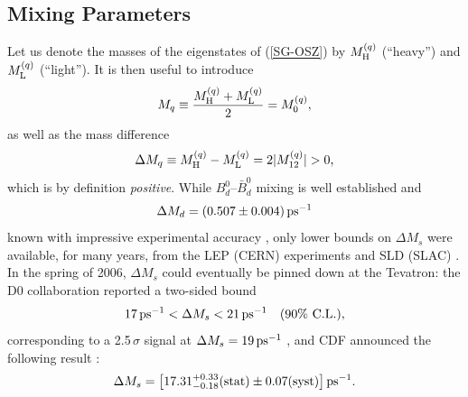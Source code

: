 \documentclass[11pt]{cernrep}
\begin{document}
\subsection{Mixing Parameters}\label{ssec:Mix-Par}
%
%
%
Let us denote the masses of the eigenstates of (\ref{SG-OSZ}) by 
$M^{(q)}_{\rm H}$ (``heavy'') and $M^{(q)}_{\rm L}$ (``light''). 
It is then useful to introduce 
\begin{equation}
M_q\equiv\frac{M^{(q)}_{\rm H}+M^{(q)}_{\rm L}}{2}=
M^{(q)}_0,
\end{equation}
as well as the mass difference
\begin{equation}\label{DeltaMq-def}
\Delta M_q\equiv M_{\rm H}^{(q)}-M_{\rm L}^{(q)}=2|M_{12}^{(q)}|>0,
\end{equation}
which is by definition {\it positive}. While $B^0_d$--$\bar B^0_d$ mixing is well established and
\begin{equation}\label{DMd-exp}
\Delta M_d = (0.507\pm 0.004)\,{\rm ps}^{-1}
\end{equation}
known with impressive
experimental accuracy \cite{HFAG},  only lower bounds on $\Delta M_s$ 
were available,  for many years, from the LEP (CERN) 
experiments and SLD (SLAC) \cite{LEPBOSC}. In the spring of 2006, 
$\Delta M_s$ could eventually be pinned down at the Tevatron: the D0 
collaboration reported a two-sided bound 
\begin{equation}\label{D0-range}
17 \,{\rm ps}^{-1}< \Delta M_s < 21\,{\rm ps}^{-1} \quad \mbox{(90\% C.L.)},
\end{equation}
corresponding to a 2.5\,$\sigma$ signal at $\Delta M_s=19\,{\rm ps}^{-1}$ 
\cite{D0}, and CDF announced the following result \cite{CDF}:
\begin{equation}\label{CDF-DMs}
\Delta M_s = \left[17.31^{+0.33}_{-0.18}({\rm
  stat})\pm 0.07({\rm syst})\right]{\rm ps}^{-1}.
\end{equation}
\end{document}
